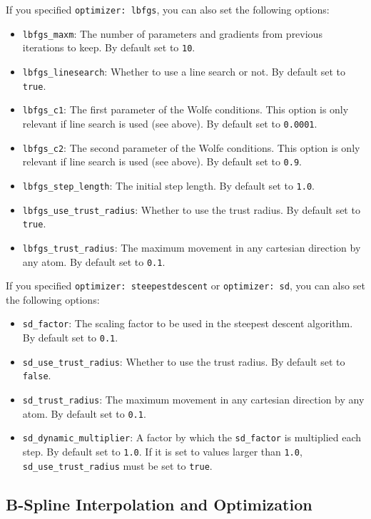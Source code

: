 \documentclass[]{tufte-book}
\begin{document}
If you specified \texttt{optimizer: lbfgs}, you can also set the following options:
\begin{itemize}
\item \texttt{lbfgs\_maxm}: The number of parameters and gradients from previous iterations to keep. By default set to
\texttt{10}.
\item \texttt{lbfgs\_linesearch}: Whether to use a line search or not. By default set to \texttt{true}.
\item \texttt{lbfgs\_c1}: The first parameter of the Wolfe conditions. This option is only relevant if line search is
used (see above). By default set to \texttt{0.0001}.
\item \texttt{lbfgs\_c2}:  The second parameter of the Wolfe conditions. This option is only relevant if line search is
used (see above). By default set to \texttt{0.9}.
\item \texttt{lbfgs\_step\_length}: The initial step length. By default set to \texttt{1.0}.
\item \texttt{lbfgs\_use\_trust\_radius}: Whether to use the trust radius. By default set to \texttt{true}.
\item \texttt{lbfgs\_trust\_radius}: The maximum movement in any cartesian direction by any atom. By default set to \texttt{0.1}.
\end{itemize}

If you specified \texttt{optimizer: steepestdescent} or \texttt{optimizer: sd}, you can also set the following options:
\begin{itemize}
\item \texttt{sd\_factor}: The scaling factor to be used in the steepest descent algorithm. By default set to \texttt{0.1}.
\item \texttt{sd\_use\_trust\_radius}: Whether to use the trust radius. By default set to \texttt{false}.
\item \texttt{sd\_trust\_radius}: The maximum movement in any cartesian direction by any atom. By default set to \texttt{0.1}.
\item \texttt{sd\_dynamic\_multiplier}: A factor by which the \texttt{sd\_factor} is multiplied each step. By default set to \texttt{1.0}.
If it is set to values larger than \texttt{1.0}, \texttt{sd\_use\_trust\_radius} must be set to \texttt{true}.
\end{itemize}

\subsection{B-Spline Interpolation and Optimization}\label{sec: b-spline}
\end{document}

